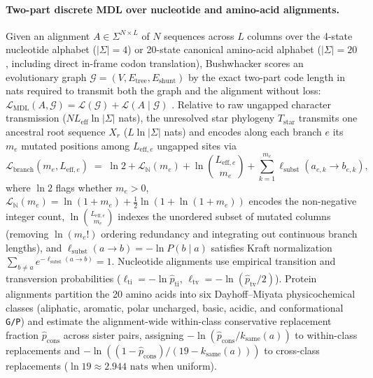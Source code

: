 \documentclass[11pt,a4paper]{article}
\begin{document}
\paragraph{Two-part discrete MDL over nucleotide and amino-acid alignments.}
Given an alignment $A \in \Sigma^{N \times L}$ of $N$ sequences across $L$ columns over the 4-state nucleotide alphabet ($|\Sigma| = 4$) or 20-state canonical amino-acid alphabet ($|\Sigma| = 20$, including direct in-frame codon translation), Bushwhacker scores an evolutionary graph $\mathcal{G} = (V, E_{\text{tree}}, E_{\text{shunt}})$ by the exact two-part code length in nats required to transmit both the graph and the alignment without loss: $\mathcal{L}_{\text{MDL}}(A, \mathcal{G}) = \mathcal{L}(\mathcal{G}) + \mathcal{L}(A \mid \mathcal{G})$ \citep{rissanen1978modeling,rissanen1983universal}. Relative to raw ungapped character transmission ($N L_{\text{eff}}\ln|\Sigma|$ nats), the unresolved star phylogeny $T_{\text{star}}$ transmits one ancestral root sequence $X_r$ ($L\ln|\Sigma|$ nats) and encodes along each branch $e$ its $m_e$ mutated positions among $L_{\text{eff}, e}$ ungapped sites via
\begin{equation}
    \mathcal{L}_{\text{branch}}(m_e, L_{\text{eff}, e}) \;=\; \ln 2 + \mathcal{L}_{\mathbb{N}}(m_e) + \ln\binom{L_{\text{eff}, e}}{m_e} + \sum_{k=1}^{m_e} \ell_{\text{subst}}(a_{e,k} \to b_{e,k}),
    \label{eq:sci_branch}
\end{equation}
where $\ln 2$ flags whether $m_e > 0$, $\mathcal{L}_{\mathbb{N}}(m_e) = \ln(1 + m_e) + \frac{1}{2}\ln(1 + \ln(1 + m_e))$ encodes the non-negative integer count, $\ln\binom{L_{\text{eff}, e}}{m_e}$ indexes the unordered subset of mutated columns (removing $\ln(m_e!)$ ordering redundancy and integrating out continuous branch lengths), and $\ell_{\text{subst}}(a \to b) = -\ln P(b \mid a)$ satisfies Kraft normalization $\sum_{b \neq a} e^{-\ell_{\text{subst}}(a \to b)} = 1$. Nucleotide alignments use empirical transition and transversion probabilities ($\ell_{\text{ti}} = -\ln\hat{p}_{\text{ti}}$, $\ell_{\text{tv}} = -\ln(\hat{p}_{\text{tv}}/2)$). Protein alignments partition the 20 amino acids into six Dayhoff--Miyata physicochemical classes \citep{dayhoff1978model} (aliphatic, aromatic, polar uncharged, basic, acidic, and conformational \texttt{G/P}) and estimate the alignment-wide within-class conservative replacement fraction $\hat{p}_{\text{cons}}$ across sister pairs, assigning $-\ln(\hat{p}_{\text{cons}} / k_{\text{same}}(a))$ to within-class replacements and $-\ln((1 - \hat{p}_{\text{cons}}) / (19 - k_{\text{same}}(a)))$ to cross-class replacements ($\ln 19 \approx 2.944\text{ nats}$ when uniform).
\end{document}
